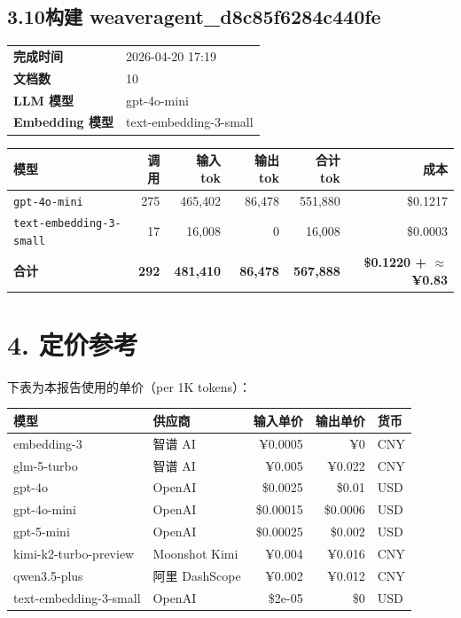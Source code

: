 \documentclass[11pt]{article}
\begin{document}
\subsection*{3.10\;构建 weaveragent\_d8c85f6284c440fe}
\noindent\begin{minipage}{\textwidth}
\begin{tabular}{@{}ll@{}}
\textbf{完成时间} & 2026-04-20 17:19 \\
\textbf{文档数} & 10 \\
\textbf{LLM 模型} & gpt-4o-mini \\
\textbf{Embedding 模型} & text-embedding-3-small \\
\end{tabular}
\end{minipage}
\par\vspace{0.25cm}
\noindent\begin{tabularx}{\textwidth}{@{}X r r r r r@{}}
\toprule
\rowcolor{headerbg!10}\textbf{模型} & \textbf{调用} & \textbf{输入 tok} & \textbf{输出 tok} & \textbf{合计 tok} & \textbf{成本} \\
\midrule
\rowcolor{rowalt}\texttt{\small gpt-4o-mini} & 275 & 465{,}402 & 86{,}478 & 551{,}880 & \$0.1217 \\
\texttt{\small text-embedding-3-small} & 17 & 16{,}008 & 0 & 16{,}008 & \$0.0003 \\
\midrule
\rowcolor{headerbg!15}\textbf{合计} & \textbf{292} & \textbf{481{,}410} & \textbf{86{,}478} & \textbf{567{,}888} & \textbf{\$0.1220 + $\approx$ ¥0.83} \\
\bottomrule
\end{tabularx}
\vspace{0.5cm}
\section*{4. 定价参考}
\small
下表为本报告使用的单价（per 1K tokens）：
\begin{longtable}{@{}l l r r l@{}}
\toprule
\textbf{模型} & \textbf{供应商} & \textbf{输入单价} & \textbf{输出单价} & \textbf{货币} \\
\midrule
embedding-3 & 智谱 AI & ¥0.0005 & ¥0 & CNY \\
glm-5-turbo & 智谱 AI & ¥0.005 & ¥0.022 & CNY \\
gpt-4o & OpenAI & \$0.0025 & \$0.01 & USD \\
gpt-4o-mini & OpenAI & \$0.00015 & \$0.0006 & USD \\
gpt-5-mini & OpenAI & \$0.00025 & \$0.002 & USD \\
kimi-k2-turbo-preview & Moonshot Kimi & ¥0.004 & ¥0.016 & CNY \\
qwen3.5-plus & 阿里 DashScope & ¥0.002 & ¥0.012 & CNY \\
text-embedding-3-small & OpenAI & \$2e-05 & \$0 & USD \\
\bottomrule
\end{longtable}
\normalsize
\end{document}
